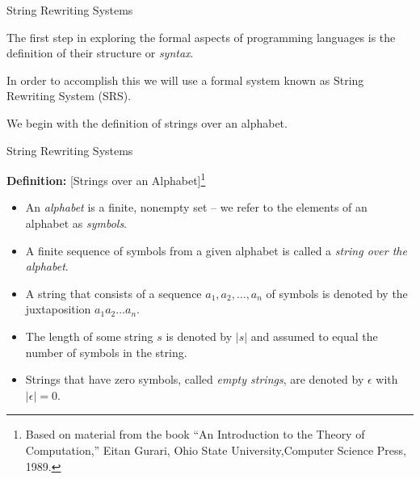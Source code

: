 \documentclass{beamer}
\begin{document}
\begin{frame}[fragile]{String Rewriting Systems}

\small
The first step in exploring the formal aspects of programming languages is the definition of
their structure or {\em syntax}.

\vspace{.1in}
In order to accomplish this we will use a formal system known as String Rewriting System (SRS).

\vspace{.1in}

We begin with the definition of strings over an alphabet.

\end{frame}

\begin{frame}[fragile]{String Rewriting Systems}

\small

{\bf Definition:} [Strings over an Alphabet]\footnote{\tiny Based on material from the book ``An Introduction to the Theory of Computation,'' Eitan Gurari, Ohio State University,Computer Science Press, 1989.}
\begin{itemize}
\item An {\em alphabet} is a finite, nonempty set -- we refer to the elements of an alphabet as {\em symbols}. 
\item A finite sequence of symbols from a given alphabet is called a {\em string over the alphabet}. 
\item A string that consists of a sequence $a_1, a_2,\ldots, a_n$ of symbols is denoted by the juxtaposition $a_1a_2\ldots a_n$. 
\item The length of some string $s$  is denoted by $|s|$ and assumed to equal the number of symbols in the string.
\item Strings that have zero symbols, called {\em empty strings}, are denoted by $\epsilon$ with $|\epsilon|=0$.
\end{itemize}
\end{frame}
\end{document}
